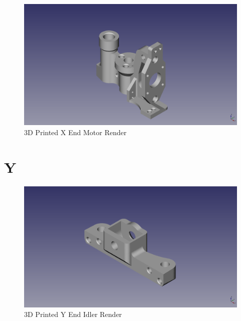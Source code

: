 \begin{figure}[H]
\centering
\includegraphics[keepaspectratio=true,angle=0,height=1.0\textheight,width=1.0\textwidth]{STL/xendmotor.stl.png}
\caption{3D Printed X End Motor Render}
\label{fig:render}
\end{figure}

\section{Y}

\begin{figure}[H]
\centering
\includegraphics[keepaspectratio=true,angle=0,height=1.0\textheight,width=1.0\textwidth]{STL/yendidler.stl.png}
\caption{3D Printed Y End Idler Render}
\label{fig:render}
\end{figure}

